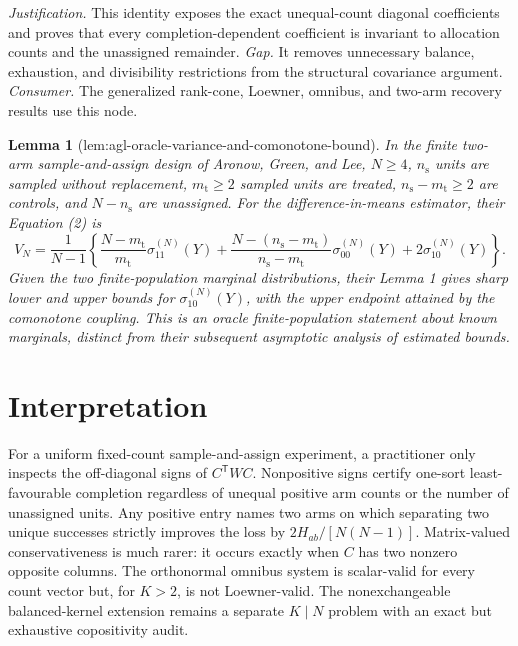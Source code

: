 \documentclass{article}
\newtheorem{lemma}{Lemma}
\begin{document}
\par\smallskip\noindent \textit{Justification.} This identity exposes the exact unequal-count diagonal coefficients and proves that every completion-dependent coefficient is invariant to allocation counts and the unassigned remainder. \textit{Gap.} It removes unnecessary balance, exhaustion, and divisibility restrictions from the structural covariance argument. \textit{Consumer.} The generalized rank-cone, Loewner, omnibus, and two-arm recovery results use this node.

\begin{lemma}[lem:agl-oracle-variance-and-comonotone-bound]\label{lem:agl-oracle-variance-and-comonotone-bound}
In the finite two-arm sample-and-assign design of Aronow, Green, and Lee, \(N\geq4\), \(n_{\mathrm s}\) units are sampled without replacement, \(m_{\mathrm t}\geq2\) sampled units are treated, \(n_{\mathrm s}-m_{\mathrm t}\geq2\) are controls, and \(N-n_{\mathrm s}\) are unassigned. For the difference-in-means estimator, their Equation (2) is
\[
V_N=\frac1{N-1}\left\{
\frac{N-m_{\mathrm t}}{m_{\mathrm t}}\sigma_{11}^{(N)}(Y)
+\frac{N-(n_{\mathrm s}-m_{\mathrm t})}{n_{\mathrm s}-m_{\mathrm t}}\sigma_{00}^{(N)}(Y)
+2\sigma_{10}^{(N)}(Y)
\right\}.
\]
Given the two finite-population marginal distributions, their Lemma 1 gives sharp lower and upper bounds for \(\sigma_{10}^{(N)}(Y)\), with the upper endpoint attained by the comonotone coupling. This is an oracle finite-population statement about known marginals, distinct from their subsequent asymptotic analysis of estimated bounds.
\end{lemma}

\section{Interpretation}

For a uniform fixed-count sample-and-assign experiment, a practitioner only inspects the off-diagonal signs of \(C^{\mathsf T}WC\).  Nonpositive signs certify one-sort least-favourable completion regardless of unequal positive arm counts or the number of unassigned units.  Any positive entry names two arms on which separating two unique successes strictly improves the loss by \(2H_{ab}/[N(N-1)]\).  Matrix-valued conservativeness is much rarer: it occurs exactly when \(C\) has two nonzero opposite columns.  The orthonormal omnibus system is scalar-valid for every count vector but, for \(K>2\), is not Loewner-valid.  The nonexchangeable balanced-kernel extension remains a separate \(K\mid N\) problem with an exact but exhaustive copositivity audit.
\end{document}
